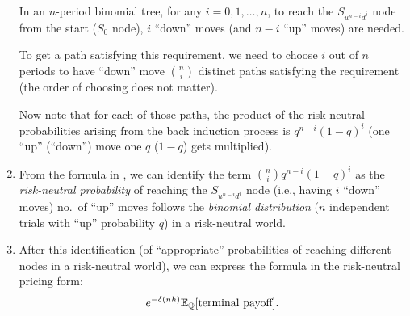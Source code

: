 \begin{enumerate}
\begin{pf}
In an \(n\)-period binomial tree, for any \(i=0,1,\dotsc,n\), to reach the
\(S_{u^{n-i}d^{i}}\) node from the start (\(S_0\) node), \(i\) ``down'' moves
(and \(n-i\) ``up'' moves) are needed.

To get a path satisfying this requirement, we need to choose \(i\) out of \(n\)
periods to have ``down'' move  \(\binom{n}{i}\) distinct
paths satisfying the requirement (the order of choosing does not matter).

Now note that for each of those paths, the product of the risk-neutral
probabilities arising from the back induction process is \(q^{n-i}(1-q)^{i}\)
(one ``up'' (``down'') move  one \(q\) (\(1-q\)) gets
multiplied).
\end{pf}

\item From the formula in , we can
identify the term \(\binom{n}{i}q^{n-i}(1-q)^{i}\) as the \emph{risk-neutral
probability} of reaching the \(S_{u^{n-i}d^{i}}\) node (i.e., having \(i\)
``down'' moves)  no.\ of ``up'' moves follows
the \emph{binomial distribution} (\(n\) independent trials with ``up'' probability
\(q\)) in a risk-neutral world.

\item \label{it:mult-period-rn-pricing-fmla}
After this identification (of ``appropriate'' probabilities of reaching
different nodes in a risk-neutral world), we can express the formula in
 the risk-neutral pricing form:
\begin{equation}
\label{eq:mult-period-rn-pricing-fmla}
e^{-\delta(nh)}\mathbb{E}_{\mathbb{Q}}\qty[\text{terminal payoff}].
\end{equation}
\end{enumerate}
